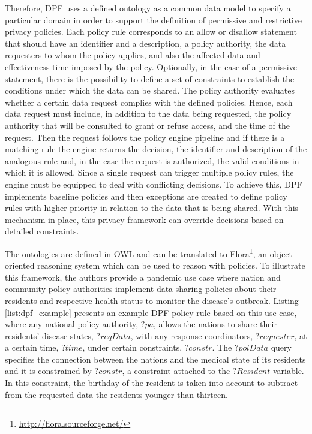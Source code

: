 Therefore, DPF uses a defined ontology as a common data model to specify a particular domain in order to support the definition of permissive and restrictive privacy policies.
Each policy rule corresponds to an allow or disallow statement that should have an identifier and a description, a policy authority, the data requesters to whom the policy applies, and also the affected data and effectiveness time imposed by the policy.
Optionally, in the case of a permissive statement, there is the possibility to define a set of constraints to establish the conditions under which the data can be shared.
The policy authority evaluates whether a certain data request complies with the defined policies.
Hence, each data request must include, in addition to the data being requested, the policy authority that will be consulted to grant or refuse access, and the time of the request.
Then the request follows the policy engine pipeline and if there is a matching rule the engine returns the decision, the identifier and description of the analogous rule and, in the case the request is authorized, the valid conditions in which it is allowed.
Since a single request can trigger multiple policy rules, the engine must be equipped to deal with conflicting decisions.
To achieve this, DPF implements baseline policies and then exceptions are created to define policy rules with higher priority in relation to the data that is being shared.
With this mechanism in place, this privacy framework can override decisions based on detailed constraints.

The ontologies are defined in OWL and can be translated to Flora\footnote{\url{http://flora.sourceforge.net/}}, an object-oriented reasoning system which can be used to reason with policies.
To illustrate this framework, the authors provide a pandemic use case where nation and community policy authorities implement data-sharing policies about their residents and respective health status to monitor the disease's outbreak.
Listing \ref{list:dpf_example} presents an example DPF policy rule based on this use-case, where any national policy authority, $?pa$, allows the nations to share their residents' disease states, $?reqData$, with any response coordinators, $?requester$, at a certain time, $?time$, under certain constraints, $?constr$. The $?polData$ query specifies the connection between the nations and the medical state of its residents and it is constrained by $?constr$, a constraint attached to the $?Resident$ variable. In this constraint, the birthday of the resident is taken into account to subtract from the requested data the residents younger than thirteen.

